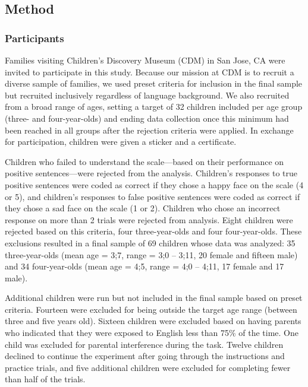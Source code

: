 \documentclass[man, noapacite]{apa2}
\begin{document}
\subsection{Method}

\subsubsection{Participants}

Families visiting Children's Discovery Museum (CDM) in San Jose, CA were invited to participate in this study. Because our mission at CDM is to recruit a diverse sample of families, we used preset criteria for inclusion in the final sample but recruited inclusively regardless of language background. We also recruited from a broad range of ages, setting a target of 32 children included per age group (three- and four-year-olds) and ending data collection once this minimum had been reached in all groups after the rejection criteria were applied. In exchange for participation, children were given a sticker and a certificate.

Children who failed to understand the scale---based on their performance on positive sentences---were rejected from the analysis. Children's responses to true positive sentences were coded as correct if they chose a happy face on the scale (4 or 5), and children's responses to false positive sentences were coded as correct if they chose a sad face on the scale (1 or 2). Children who chose an incorrect response on more than 2 trials were rejected from analysis. Eight children were rejected based on this criteria, four three-year-olds and four four-year-olds. These exclusions resulted in a final sample of 69 children whose data was analyzed: 35 three-year-olds (mean age = 3;7, range = 3;0 -- 3;11, 20 female and fifteen male) and 34 four-year-olds (mean age = 4;5, range = 4;0 -- 4;11, 17 female and 17 male).

Additional children were run but not included in the final sample based on preset criteria. Fourteen were excluded for being outside the target age range (between three and five years old). Sixteen children were excluded based on having parents who indicated that they were exposed to English less than 75\% of the time. One child was excluded for parental interference during the task. Twelve children declined to continue the experiment after going through the instructions and practice trials, and five additional children were excluded for completing fewer than half of the trials.
\end{document}
